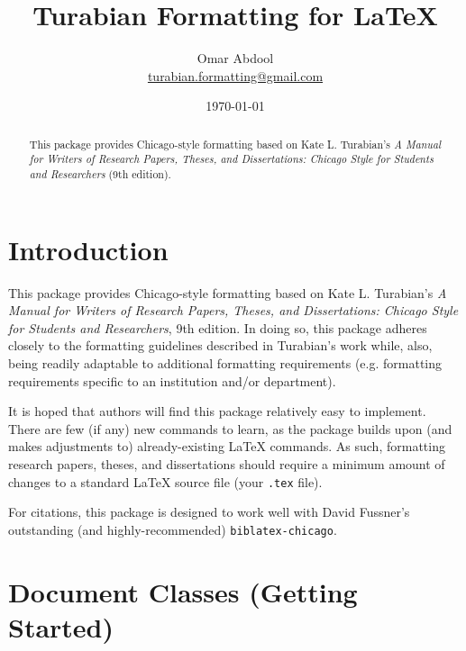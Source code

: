 \documentclass{article}
\title{Turabian Formatting for \LaTeX{}}
\author{Omar Abdool \\
{\normalsize \href{mailto:turabian.formatting@gmail.com}{turabian.formatting@gmail.com}}}
\date{\today}
\begin{document}
\maketitle

\renewcommand{\abstractname}{}

\begin{abstract}
\vspace{-\baselineskip}
\noindent This package provides Chicago-style formatting based on Kate L. Turabian's \emph{A Manual for Writers of Research Papers, Theses, and Dissertations: Chicago Style for Students and Researchers} (9th edition).
\end{abstract}


\tableofcontents



\reversemarginpar
\setlength\parindent{0in}
\setlength\parskip{1\baselineskip}



\section*{Introduction}
\label{sec:introduction}


This package provides Chicago-style formatting based on Kate L. Turabian's \emph{A Manual for Writers of Research Papers, Theses, and Dissertations: Chicago Style for Students and Researchers}, 9th edition. In doing so, this package adheres closely to the formatting guidelines described in Turabian's work while, also, being readily adaptable to additional formatting requirements (e.g. formatting requirements specific to an institution and/or department).

It is hoped that authors will find this package relatively easy to implement. There are few (if any) new commands to learn, as the package builds upon (and makes adjustments to) already-existing \LaTeX{} commands. As such, formatting research papers, theses, and dissertations should require a minimum amount of changes to a standard \LaTeX{} source file (your \texttt{.tex} file).

For citations, this package is designed to work well with David Fussner's outstanding (and highly-recommended) \texttt{biblatex-chicago}.


\clearpage
\section{Document Classes (Getting Started)}
\label{sec:implementation}
\end{document}
